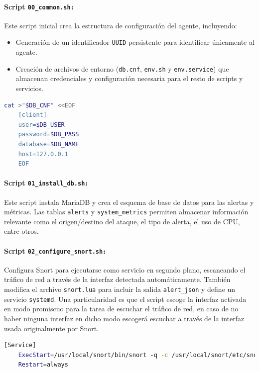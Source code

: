\documentclass[11pt,a4paper,twoside]{report}
\begin{document}
\paragraph{Script \texttt{00\_common.sh:}} Este script inicial crea la estructura de configuración del agente, incluyendo:

\begin{itemize}
	\item Generación de un identificador \texttt{UUID} persistente para identificar únicamente al agente.
	\item Creación de archivos de entorno (\texttt{db.cnf}, \texttt{env.sh} y \texttt{env.service}) que almacenan credenciales y configuración necesaria para el resto de scripts y servicios.
\end{itemize}

\begin{lstlisting}[language=bash, caption={Fragmento de creación del archivo db.cnf}]
	cat >"$DB_CNF" <<EOF
	[client]
	user=$DB_USER
	password=$DB_PASS
	database=$DB_NAME
	host=127.0.0.1
	EOF
\end{lstlisting}

\paragraph{Script \texttt{01\_install\_db.sh:}} Este script instala MariaDB y crea el esquema de base de datos para las alertas y métricas. Las tablas \texttt{alerts} y \texttt{system\_metrics} permiten almacenar información relevante como el origen/destino del ataque, el tipo de alerta, el uso de CPU, entre otros.

\paragraph{Script \texttt{02\_configure\_snort.sh:}} Configura Snort para ejecutarse como servicio en segundo plano, escaneando el tráfico de red a través de la interfaz detectada automáticamente. También modifica el archivo \texttt{snort.lua} para incluir la salida \texttt{alert\_json} y define un servicio \texttt{systemd}. Una particularidad es que el script escoge la interfaz activada en modo promiscuo para la tarea de escuchar el tráfico de red, en caso de no haber ninguna interfaz en dicho modo escogerá escuchar a través de la interfaz usada originalmente por Snort.

\begin{lstlisting}[language=bash, caption={Definición del servicio systemd para Snort}]
	[Service]
	ExecStart=/usr/local/snort/bin/snort -q -c /usr/local/snort/etc/snort/snort.lua -i $IFACE -A alert_json -l /opt/snort/logs/live
	Restart=always
\end{lstlisting}
\end{document}
